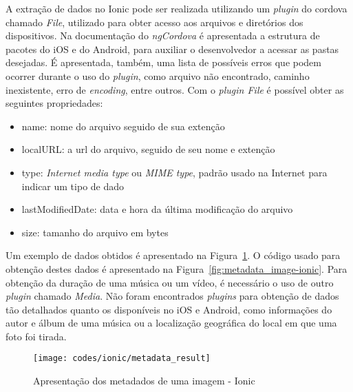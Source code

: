
A extração de dados no Ionic pode ser realizada utilizando um \textit{plugin} do cordova chamado \textit{File}, utilizado para obter 
acesso aos arquivos e diretórios dos dispositivos. Na documentação do \textit{ngCordova} é apresentada a estrutura de pacotes do iOS e 
do Android, para auxiliar o desenvolvedor a acessar as pastas desejadas. É apresentada, também, uma lista de possíveis erros
que podem ocorrer durante o uso do \textit{plugin}, como arquivo não encontrado, caminho inexistente, erro de \textit{encoding}, entre outros.
Com o \textit{plugin File} é possível obter as seguintes propriedades:
 
\begin{itemize}
	\item name: nome do arquivo seguido de sua extenção
	\item localURL: a url do arquivo, seguido de seu nome e extenção
	\item type: \textit{Internet media type} ou \textit{MIME type}, padrão usado na Internet para indicar um tipo de dado
	\item lastModifiedDate: data e hora da última modificação do arquivo
	\item size: tamanho do arquivo em bytes
\end{itemize}

Um exemplo de dados obtidos é apresentado na Figura~\ref{fig:metadata_result-ionic}. O código usado para 
obtenção destes dados é apresentado na Figura~\ref{fig:metadata_image-ionic}.
Para obtenção da duração de uma música ou um vídeo, é necessário o uso de outro  \textit{plugin} chamado \textit{Media}.
Não foram encontrados \textit{plugins} para obtenção de dados tão detalhados quanto os disponíveis no iOS e Android, como informações do autor 
e álbum de uma música ou a localização geográfica do local em que uma foto foi tirada.

\begin{figure}[H]
	\centering
	\texttt{[image: codes/ionic/metadata\_result]}
	\caption[Apresentação dos metadados de uma imagem - Ionic]{Apresentação dos metadados de uma imagem - Ionic}
	\label{fig:metadata_result-ionic}
\end{figure}

